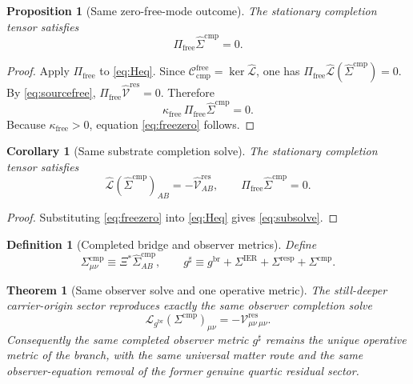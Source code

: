 \documentclass[11pt]{article}
\newcommand{\ObserverMap}{\Xi}
\newcommand{\ObserverMetric}{g^{\mathrm{br}}}
\newcommand{\CompletedMetric}{g^{\sharp}}
\newcommand{\BaseShift}{\Sigma^{\mathrm{IER}}}
\newcommand{\ResponseShift}{\Sigma^{\mathrm{resp}}}
\newcommand{\CompShift}{\Sigma^{\mathrm{cmp}}}
\newcommand{\CompLift}{\widehat\Sigma^{\mathrm{cmp}}}
\newcommand{\ResidualCore}{\mathcal V_{\mu\nu}^{\mathrm{res}}}
\newcommand{\ResidualLift}{\widehat{\mathcal V}^{\mathrm{res}}}
\newcommand{\SubReducedEin}{\widehat{\mathcal L}}
\newcommand{\FreeProj}{\Pi_{\mathrm{free}}}
\newcommand{\ReducedEin}{\mathcal L_{\ObserverMetric}}
\newcommand{\CompFree}{\mathscr C_{\mathrm{cmp}}^{\mathrm{free}}}
\newcommand{\FreeStiff}{\kappa_{\mathrm{free}}}
\newtheorem{definition}{Definition}
\newtheorem{proposition}{Proposition}
\newtheorem{corollary}{Corollary}
\newtheorem{theorem}{Theorem}
\begin{document}
\begin{proposition}[Same zero-free-mode outcome]
\label{prop:freezero}
The stationary completion tensor satisfies
\begin{equation}
\FreeProj\CompLift=0.
\label{eq:freezero}
\end{equation}
\end{proposition}

\begin{proof}
Apply \(\FreeProj\) to \eqref{eq:Heq}. Since \(\CompFree=\ker\SubReducedEin\), one has \(\FreeProj\SubReducedEin(\CompLift)=0\). By \eqref{eq:sourcefree}, \(\FreeProj\ResidualLift=0\). Therefore
\[
\FreeStiff\,\FreeProj\CompLift=0.
\]
Because \(\FreeStiff>0\), equation \eqref{eq:freezero} follows.
\end{proof}

\begin{corollary}[Same substrate completion solve]
\label{cor:subsolve}
The stationary completion tensor satisfies
\begin{equation}
\SubReducedEin(\CompLift)_{AB}
=
-\ResidualLift_{AB},
\qquad
\FreeProj\CompLift=0.
\label{eq:subsolve}
\end{equation}
\end{corollary}

\begin{proof}
Substituting \eqref{eq:freezero} into \eqref{eq:Heq} gives \eqref{eq:subsolve}.
\end{proof}

\begin{definition}[Completed bridge and observer metrics]
\label{def:completed}
Define
\begin{equation}
\CompShift_{\mu\nu}
\equiv
\ObserverMap^*\CompLift_{AB},
\qquad
\CompletedMetric
\equiv
\ObserverMetric+\BaseShift+\ResponseShift+\CompShift.
\label{eq:completedmetric}
\end{equation}
\end{definition}

\begin{theorem}[Same observer solve and one operative metric]
\label{thm:observer}
The still-deeper carrier-origin sector reproduces exactly the same observer completion solve
\begin{equation}
\ReducedEin(\CompShift)_{\mu\nu}
=
-\ResidualCore{}_{\mu\nu}.
\label{eq:observereq}
\end{equation}
Consequently the same completed observer metric \(\CompletedMetric\) remains the unique operative metric of the branch, with the same universal matter route and the same observer-equation removal of the former genuine quartic residual sector.
\end{theorem}
\end{document}
